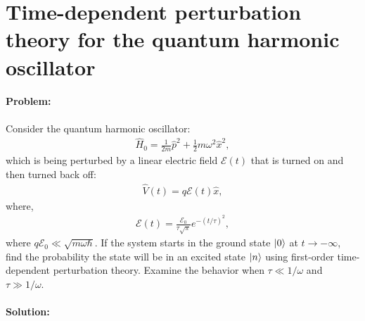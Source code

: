 \documentclass[10pt]{article}
\newcommand{\1}{\mathbf 1}
\begin{document}

\newpage

\section*{Time-dependent perturbation theory for the quantum harmonic oscillator}


\paragraph{Problem:}

Consider the quantum harmonic oscillator:
\begin{align}
	\hat H_0
	=
	\frac{1}{2m}\hat p^2
	+
	\frac{1}{2}m \omega^2 \hat x^2,
\end{align}
which is being perturbed by a linear electric field $\mathcal{E}(t)$ that is turned on and then turned back off:
\begin{align}
	\hat V(t)
	=
	q \mathcal{E}(t) \hat x,
\end{align}
where,
\begin{align}
	\mathcal{E}(t)
	=
	\frac{\mathcal{E}_0}{\tau\sqrt{\pi}}
	e^{-(t/\tau)^2},
\end{align}
where $q\mathcal{E}_0 \ll \sqrt{m\omega\hbar}$.
If the system starts in the ground state $\ket{0}$ at $t \to -\infty$, find the probability the state will be in an excited state $\ket{n}$ using first-order time-dependent perturbation theory.
Examine the behavior when $\tau \ll 1/\omega$ and $\tau \gg 1/\omega$.


\paragraph{Solution:}
\end{document}

